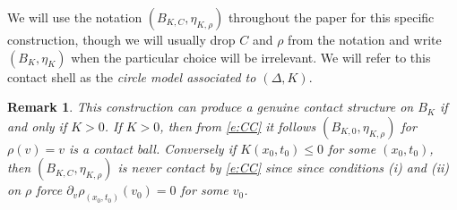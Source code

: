 \documentclass[12pt]{paper}
\theoremstyle{plain}
\newtheorem{remark}[theorem]{Remark}
\theoremstyle{definition}
\newcommand{\p}{\partial}
\newcommand{\R}{{\mathbb{R}}}
\numberwithin{figure}{section}
\begin{document}
We will use the notation $(B_{K, C}, \eta_{K, \rho})$ throughout the paper for this specific construction, though we will usually  drop
$C$ and $\rho$ from the notation and write $(B_K, \eta_{K})$ when the particular choice will be irrelevant.  We will refer to this contact shell as the \emph{circle model associated to $(\Delta, K)$}.

\begin{remark} {\rm This construction can produce a genuine contact structure on $B_K$ if and only if $K > 0$.
If $K > 0$, then from \eqref{e:CC} it follows $(B_{K, 0}, \eta_{K, \rho})$ for $\rho(v) = v$ is a contact ball.
Conversely if $K(x_0,t_0) \leq 0$ for some $(x_0, t_0)$, then $(B_{K,C}, \eta_{K, \rho})$ is
never contact by \eqref{e:CC} since 
	since conditions (i) and (ii) on $\rho$ force
	$\p_v\rho_{(x_0,t_0)}(v_0) = 0$ for some $v_0$.}
\end{remark}

\end{document}

